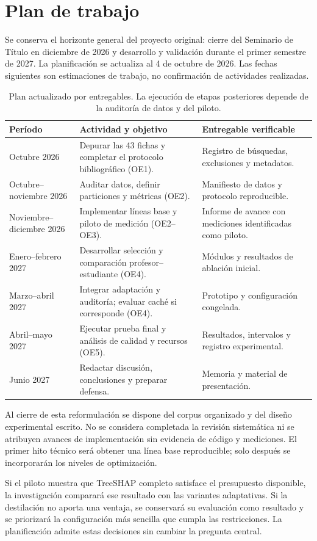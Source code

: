 \chapter{Plan de trabajo}
Se conserva el horizonte general del proyecto original: cierre del Seminario de Título en diciembre de 2026 y desarrollo y validación durante el primer semestre de 2027. La planificación se actualiza al 4 de octubre de 2026. Las fechas siguientes son estimaciones de trabajo, no confirmación de actividades realizadas.

\begin{table}[htbp]
\centering\small
\begin{tabularx}{\textwidth}{p{2.4cm}Xp{3.8cm}}
\toprule
Período & Actividad y objetivo & Entregable verificable \\
\midrule
Octubre 2026 & Depurar las 43 fichas y completar el protocolo bibliográfico (OE1). & Registro de búsquedas, exclusiones y metadatos. \\
Octubre--noviembre 2026 & Auditar datos, definir particiones y métricas (OE2). & Manifiesto de datos y protocolo reproducible. \\
Noviembre--diciembre 2026 & Implementar líneas base y piloto de medición (OE2--OE3). & Informe de avance con mediciones identificadas como piloto. \\
Enero--febrero 2027 & Desarrollar selección y comparación profesor--estudiante (OE4). & Módulos y resultados de ablación inicial. \\
Marzo--abril 2027 & Integrar adaptación y auditoría; evaluar caché si corresponde (OE4). & Prototipo y configuración congelada. \\
Abril--mayo 2027 & Ejecutar prueba final y análisis de calidad y recursos (OE5). & Resultados, intervalos y registro experimental. \\
Junio 2027 & Redactar discusión, conclusiones y preparar defensa. & Memoria y material de presentación. \\
\bottomrule
\end{tabularx}
\caption{Plan actualizado por entregables. La ejecución de etapas posteriores depende de la auditoría de datos y del piloto.}
\end{table}

Al cierre de esta reformulación se dispone del corpus organizado y del diseño experimental escrito. No se considera completada la revisión sistemática ni se atribuyen avances de implementación sin evidencia de código y mediciones. El primer hito técnico será obtener una línea base reproducible; solo después se incorporarán los niveles de optimización.

Si el piloto muestra que TreeSHAP completo satisface el presupuesto disponible, la investigación comparará ese resultado con las variantes adaptativas. Si la destilación no aporta una ventaja, se conservará su evaluación como resultado y se priorizará la configuración más sencilla que cumpla las restricciones. La planificación admite estas decisiones sin cambiar la pregunta central.
